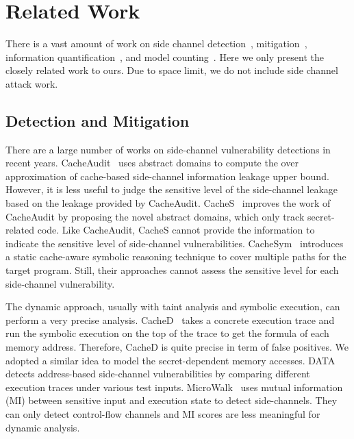 \section{Related Work}

There is a vast amount of work on 
side channel 
detection~\cite{182946, 236338, Brotzman19Casym, 203878,217537,Wichelmann:2018:MFF:3274694.3274741,langley2010ctgrind}, 
mitigation~\cite{Page2005PartitionedCA,
Wang:2007:NCD:1250662.1250723,Zhang:2015:HDL:2775054.2694372,Li:2014:SLH:2541940.2541947,
236344,shih2017t,Coppens:2009:PMT:1607723.1608124,
brickell2006software,crane2015thwarting}, 
information
quantification~\cite{biondi2018scalable,10.1007/978-3-642-31424-7_40,McCamantE2008,5207642,Phan:2012:SQI:2382756.2382791,Chattopadhyay:2017:QIL:3127041.3127044}, 
and model counting~\cite{wei2005new, gomes2007sampling, gomes2006model, kroc2008leveraging, Chattopadhyay:2017:QIL:3127041.3127044}.
Here we only present the closely related work to ours.
Due to space limit, we do not include side channel attack work.

\subsection{Detection and Mitigation}

There are a large number of works on side-channel vulnerability detections in
recent years.  CacheAudit~\cite{182946} uses abstract domains to compute the
over approximation of cache-based side-channel information leakage upper bound.
However, it is
less useful to judge the sensitive level of the side-channel leakage based on
the leakage provided by CacheAudit. CacheS~\cite{236338} improves the work of
CacheAudit by proposing the novel abstract domains, which only track
secret-related code. Like CacheAudit, CacheS cannot provide the information to
indicate the sensitive level of side-channel vulnerabilities.
CacheSym~\cite{Brotzman19Casym} introduces a static cache-aware symbolic
reasoning technique to cover multiple paths for the target program. Still, their
approaches cannot assess the sensitive level for each side-channel
vulnerability.

The dynamic approach, usually with taint analysis and symbolic execution,
can perform a very precise analysis. CacheD~\cite{203878} takes a concrete
 execution trace and run the symbolic execution on the top of the trace
to get the formula of each memory address. Therefore, CacheD is
quite precise in term of false positives. We adopted a similar idea to model the
secret-dependent memory accesses. DATA~\cite{217537} detects address-based
side-channel vulnerabilities by comparing different execution traces under
various test inputs. MicroWalk~\cite{Wichelmann:2018:MFF:3274694.3274741} uses
mutual information (MI) between sensitive input and execution state to detect
side-channels. They can only detect control-flow channels and MI scores are less
meaningful for dynamic analysis.

